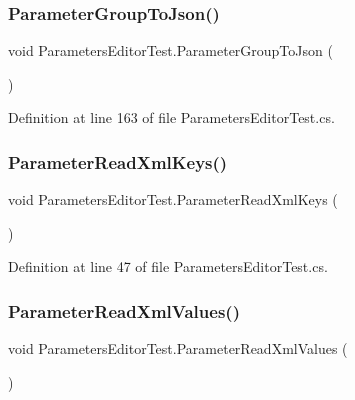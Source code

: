 \subsubsection{\texorpdfstring{Parameter\+Group\+To\+Json()}{ParameterGroupToJson()}}
{\footnotesize\ttfamily void Parameters\+Editor\+Test.\+Parameter\+Group\+To\+Json (\begin{DoxyParamCaption}{ }\end{DoxyParamCaption})}



Definition at line 163 of file Parameters\+Editor\+Test.\+cs.

\mbox{\label{class_parameters_editor_test_a6898c4091b4e195b02c3a70738fb394e}} 
\subsubsection{\texorpdfstring{Parameter\+Read\+Xml\+Keys()}{ParameterReadXmlKeys()}}
{\footnotesize\ttfamily void Parameters\+Editor\+Test.\+Parameter\+Read\+Xml\+Keys (\begin{DoxyParamCaption}{ }\end{DoxyParamCaption})}



Definition at line 47 of file Parameters\+Editor\+Test.\+cs.

\mbox{\label{class_parameters_editor_test_a52328474e8650852f576fb44dd4a55d7}} 
\subsubsection{\texorpdfstring{Parameter\+Read\+Xml\+Values()}{ParameterReadXmlValues()}}
{\footnotesize\ttfamily void Parameters\+Editor\+Test.\+Parameter\+Read\+Xml\+Values (\begin{DoxyParamCaption}{ }\end{DoxyParamCaption})}



